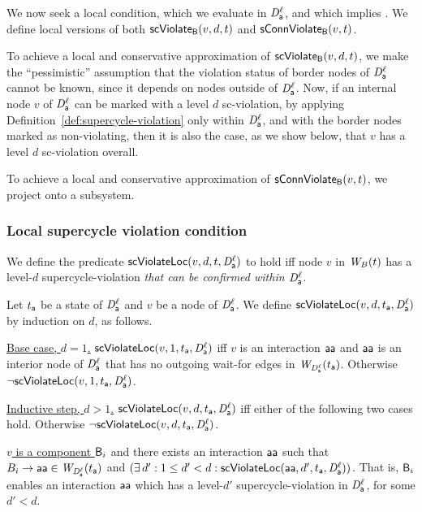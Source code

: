 
We now seek a local condition, which we evaluate in $\mathit{D}_{\mathsf{a}}^{\ell}$, and which implies \GAO.
We define local versions of both $\mathsf{scViolate}_{\mathsf{B}}(v,d,t)$ and $\mathsf{sConnViolate}_{\mathsf{B}}(v,t)$.

To achieve a local and conservative approximation of $\mathsf{scViolate}_{\mathsf{B}}(v,d,t)$, we make the ``pessimistic'' assumption that the violation status of border
nodes of $\mathit{D}_{\mathsf{a}}^{\ell}$ cannot be known, since it depends on nodes outside of $\mathit{D}_{\mathsf{a}}^{\ell}$.
Now, if an internal node $v$ of $\mathit{D}_{\mathsf{a}}^{\ell}$ can be marked with a level $d$ sc-violation, by applying 
Definition~\ref{def:supercycle-violation} only within
$\mathit{D}_{\mathsf{a}}^{\ell}$, and with the border nodes marked as non-violating,
then it is also the case, as we show below, that $v$ has a level $d$ sc-violation overall.

To achieve a local and conservative approximation of
$\mathsf{sConnViolate}_{\mathsf{B}}(v,t)$, we project onto a subsystem.




\subsubsection{Local supercycle violation condition}

We define the predicate $\mathsf{scViolateLoc}(v,d,t,\mathit{D}_{\mathsf{a}}^{\ell})$ to hold iff node $v$ in $\mathit{W}_{B}({t})$ has a level-$d$ supercycle-violation
\emph{that can be confirmed within $\mathit{D}_{\mathsf{a}}^{\ell}$}.

\label{def:supercycle.violation.local}
Let $t_{\mathsf{a}}$ be a state of $\mathit{D}_{\mathsf{a}}^{\ell}$ and $v$ be a node of $\mathit{D}_{\mathsf{a}}^{\ell}$.
We define $\mathsf{scViolateLoc}(v,d,t_{\mathsf{a}},\mathit{D}_{\mathsf{a}}^{\ell})$ by induction on $d$, as follows.

\noindent
\ul{Base case, $d=1$.} $\mathsf{scViolateLoc}(v,1,t_{\mathsf{a}},\mathit{D}_{\mathsf{a}}^{\ell})$  iff
$v$ is an interaction $\mathsf{aa}$ and 
$\mathsf{aa}$ is an interior node of $\mathit{D}_{\mathsf{a}}^{\ell}$ that has no outgoing wait-for edges in $\mathit{W}_{\mathit{D}_{\mathsf{a}}^{\ell}}({t_{\mathsf{a}}})$.
Otherwise $\neg \mathsf{scViolateLoc}(v,1,t_{\mathsf{a}},\mathit{D}_{\mathsf{a}}^{\ell})$. 

\noindent
\ul{Inductive step, $d > 1$.} $\mathsf{scViolateLoc}(v,d,t_{\mathsf{a}},\mathit{D}_{\mathsf{a}}^{\ell})$ iff either of the following two cases hold. Otherwise $\neg \mathsf{scViolateLoc}(v,d,t_{\mathsf{a}},\mathit{D}_{\mathsf{a}}^{\ell})$.

\bn

\item \ul{$v$ is a component $\mathsf{B}_i$} and there exists an interaction $\mathsf{aa}$ such that $B_i \rightarrow \mathsf{aa} \in \mathit{W}_{\mathit{D}_{\mathsf{a}}^{\ell}}({t_{\mathsf{a}}})$ and 
    $(\exists\, d': 1 \le d' < d : \mathsf{scViolateLoc}(\mathsf{aa},d',t_{\mathsf{a}},\mathit{D}_{\mathsf{a}}^{\ell}))$.
    That is, $\mathsf{B}_i$ enables an interaction $\mathsf{aa}$ which has a level-$d'$ supercycle-violation in $\mathit{D}_{\mathsf{a}}^{\ell}$, for some $d' < d$. 



